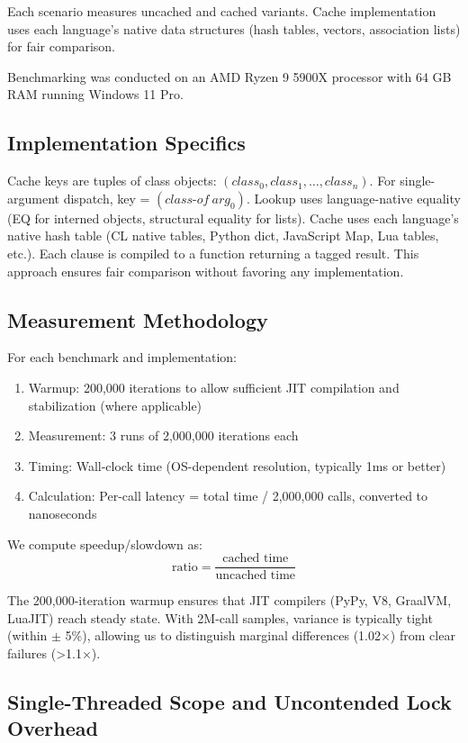 \documentclass[sigplan,final,acmsmall,review,screen]{acmart}
\begin{document}
Each scenario measures uncached and cached variants. Cache implementation uses each
language's native data structures (hash tables, vectors, association lists) for fair comparison.

Benchmarking was conducted on
an AMD Ryzen 9 5900X processor with 64 GB RAM running Windows 11 Pro.

\subsection{Implementation Specifics}

Cache keys are tuples of class objects: $(class_0, class_1, \ldots, class_n)$. For single-argument dispatch, key = $(class\text{-}of~arg_0)$. Lookup uses language-native equality (EQ for interned objects, structural equality for lists). Cache uses each language's native hash table (CL native tables, Python dict, JavaScript Map, Lua tables, etc.). Each clause is compiled to a function returning a tagged result. This approach ensures fair comparison without favoring any implementation.

\subsection{Measurement Methodology}

For each benchmark and implementation:
\begin{enumerate}
  \item Warmup: 200,000 iterations to allow sufficient JIT compilation and stabilization (where applicable)
  \item Measurement: 3 runs of 2,000,000 iterations each
  \item Timing: Wall-clock time (OS-dependent resolution, typically 1ms or better)
  \item Calculation: Per-call latency = total time / 2,000,000 calls, converted to nanoseconds
\end{enumerate}

We compute speedup/slowdown as:
\[
\text{ratio} = \frac{\text{cached time}}{\text{uncached time}}
\]

The 200,000-iteration warmup ensures that JIT compilers (PyPy, V8, GraalVM, LuaJIT) reach steady state.
With 2M-call samples, variance is typically tight (within $\pm$ 5\%), allowing us to distinguish marginal differences
(1.02×) from clear failures (>1.1×).

\subsection{Single-Threaded Scope and Uncontended Lock Overhead}
\label{sec:threading}
\end{document}
